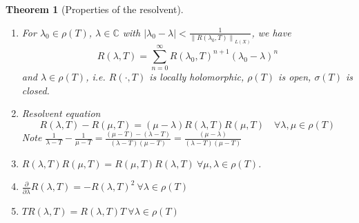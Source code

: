 \documentclass[12pt]{extreport} %
\newcommand{\C}{\mathbb{C}}
\theoremstyle{named}
\theoremstyle{nnamed}
\theoremstyle{itshape}
\newtheorem{theorem}{Theorem}  \counterwithin{theorem}{chapter}
\theoremstyle{normal}
\begin{document}
\begin{theorem}[Properties of the resolvent] ~\
	\begin{enumerate}[label=(\roman*\upshape)]
		\item For $\lambda_0 \in \rho(T)$, $\lambda \in \C$ with $\left| \lambda_0 - \lambda \right| < \frac{1}{\left\| R(\lambda_0, T) \right\|_{L(X)}}$, we have
			$$ R(\lambda, T) = \sum_{n=0}^\infty R(\lambda_0, T)^{n+1} \left( \lambda_0 - \lambda \right)^n $$
			and $\lambda \in \rho(T)$, i.e. $R(\cdot, T)$ is locally holomorphic, $\rho(T)$ is open, $\sigma(T)$ is closed.
		\item Resolvent equation
			$$ R(\lambda, T) - R(\mu, T) = \left( \mu - \lambda \right) R(\lambda, T) R(\mu, T) \quad \forall \lambda, \mu \in \rho(T) $$
			Note $\frac{1}{\lambda - T} - \frac{1}{\mu - T} = \frac{(\mu - T) - (\lambda - T)}{(\lambda - T)(\mu - T)} = \frac{(\mu - \lambda)}{(\lambda - T)(\mu - T)}$
		\item $R(\lambda, T) R(\mu, T) = R(\mu, T) R(\lambda, T) ~\forall \mu, \lambda \in \rho(T)$.
		\item $\frac{\partial}{\partial \lambda} R(\lambda, T) = - R(\lambda, T)^2 ~\forall \lambda \in \rho(T)$
		\item $T R(\lambda, T) = R(\lambda, T) T ~ \forall \lambda \in \rho(T)$
	\end{enumerate}
	

\end{theorem}
\end{document}

